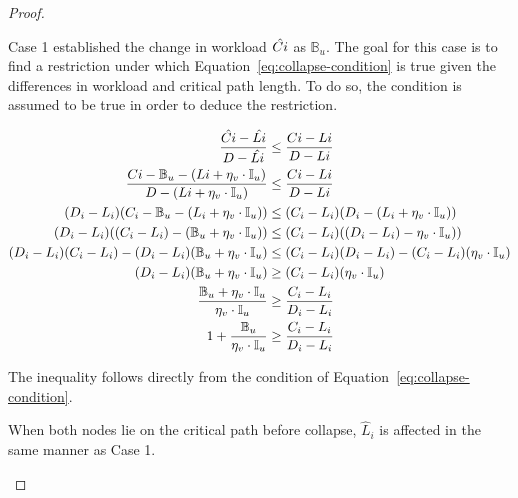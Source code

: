 \begin{theorem}
\begin{proof}
\begin{case}
      Case 1 established the change in workload
      ${\hat{C{i}}}$ as ${\mathbb{B}_u}$. The goal for this
      case is to find a restriction under which
      Equation~\ref{eq:collapse-condition} is true given the
      differences in workload and critical path length. To do so, the
      condition is assumed to be true in order to deduce the restriction.

      \begin{align*}
        \indent
        \frac{\hat{\workload{i}} - \hat{\criticalpathlen{i}}} 
             {\Deadline{i} - \hat{\criticalpathlen{i}}} &\le
        \frac{\workload{i} - \criticalpathlen{i}}
             {\Deadline{i} - \criticalpathlen{i}} \\
        \frac{\workload{i} - \mathbb{B}_u - (\criticalpathlen{i} + \eta_v
          \cdot \mathbb{I}_u)} 
             {\Deadline{i} - (\criticalpathlen{i} + \eta_v
          \cdot \mathbb{I}_u)} &\le
        \frac{\workload{i} - \criticalpathlen{i}}
             {\Deadline{i} - \criticalpathlen{i}} \\
        (D_i - L_i)(C_i - \mathbb{B}_u - (L_i + \eta_v \cdot \mathbb{I}_u))
             &\le
             (C_i - L_i)(D_i - (L_i + \eta_v \cdot \mathbb{I}_u)) \\
        (D_i - L_i)((C_i - L_i) - (\mathbb{B}_u + \eta_v \cdot \mathbb{I}_u))
             &\le
             (C_i - L_i)((D_i - L_i) - \eta_v \cdot \mathbb{I}_u)) \\
        (D_i - L_i)(C_i - L_i) -
             (D_i - L_i)(\mathbb{B}_u + \eta_v \cdot \mathbb{I}_u)
             &\le
             (C_i - L_i)(D_i - L_i) - (C_i - L_i)(\eta_v \cdot \mathbb{I}_u) \\
        (D_i - L_i)(\mathbb{B}_u + \eta_v \cdot \mathbb{I}_u)
             &\ge
             (C_i - L_i)(\eta_v \cdot \mathbb{I}_u) \\
        \frac{\mathbb{B}_u + \eta_v \cdot \mathbb{I}_u}
             {\eta_v \cdot \mathbb{I}_u}
             &\ge
             \frac{C_i - L_i}{D_i - L_i} \\
        1 + \frac{\mathbb{B}_u}
             {\eta_v \cdot \mathbb{I}_u}
             &\ge
             \frac{C_i - L_i}{D_i - L_i}
      \end{align*}

      The inequality follows directly from the condition of
      Equation~\ref{eq:collapse-condition}.
    \end{case}

    \begin{case}
      When both nodes lie on the critical path before collapse,
      ${\hat{L}_i}$ is affected in the same manner as Case 1.


\end{case}
\end{proof}
\end{theorem}
